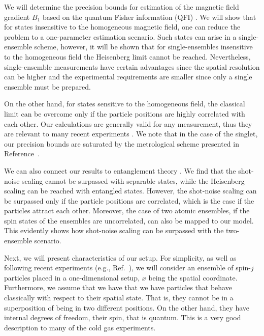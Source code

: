 
We will determine the precision bounds for estimation of the magnetic field gradient $B_1$ based on the quantum Fisher information (QFI) \cite{Paris2009,Braunstein1994,Holevo1982,Helstrom1976,Petz2002,Petz2008}.
We will show that for states insensitive to the homogeneous magnetic field, one can reduce the problem to a one-parameter estimation scenario.
Such states can arise in a single-ensemble scheme, however, it will be shown that for single-ensembles insensitive to the homogeneous field the Heisenberg limit cannot be reached.
Nevertheless, single-ensemble measurements have certain advantages since the spatial resolution can be higher and the experimental requirements are smaller since only a single ensemble must be prepared.

On the other hand, for states sensitive to the homogeneous field, the classical limit can be overcome only if the particle positions are highly correlated with each other.
Our calculations are generally valid for any measurement, thus they are relevant to many recent experiments \cite{Wasilewski2010,Eckert2006,Wildermuth2006, Wolfgramm2010,Koschorreck2011,Vengalattore2007,Zhou2010,Behbood2013}.
We note that in the case of the singlet, our precision bounds are saturated by the metrological scheme presented in Reference~\cite{Urizar-Lanz2013}.

We can also connect our results to entanglement theory \cite{Werner1989,Horodecki2009,Guehne2009}.
We find that the shot-noise scaling cannot be surpassed with separable states, while the Heisenberg scaling can be reached with entangled states.
However, the shot-noise scaling can be surpassed only if the particle positions are correlated, which is the case if the particles attract each other.
Moreover, the case of two atomic ensembles, if the spin states of the ensembles are uncorrelated, can also be mapped to our model.
This evidently shows how shot-noise scaling can be surpassed with the two-ensemble scenario.

Next, we will present characteristics of our setup.
For simplicity, as well as following  recent experiments (e.g., Ref.~\cite{Koschorreck2011}), we will consider an ensemble of spin-$j$ particles placed in a one-dimensional setup, $x$ being the spatial coordinate.
Furthermore, we assume that we have that we have particles that behave classically with respect to their spatial state.
That is, they cannot be in a superposition of being in two different positions.
On the other hand, they have internal degrees of freedom, their spin, that is quantum. This is a very good description to many of the cold gas experiments.

